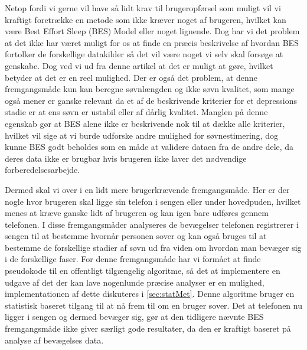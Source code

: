 Netop fordi vi gerne vil have så lidt krav til brugeropførsel som muligt vil vi kraftigt foretrække en metode som ikke kræver noget af brugeren, hvilket kan være Best Effort Sleep (BES) Model eller noget lignende. 
Dog har vi det problem at det ikke har været muligt for os at finde en præcis beskrivelse af hvordan BES fortolker de forskellige datakilder så det vil være noget vi selv skal forsøge at genskabe.
Dog ved vi ud fra denne artikel at det er muligt at gøre, hvilket betyder at det er en reel mulighed.
Der er også det problem, at denne fremgangsmåde kun kan beregne søvnlængden og ikke søvn kvalitet, som mange også mener er ganske relevant da et af de beskrivende kriterier for et depressions stadie er at ens søvn er ustabil eller af dårlig kvalitet.
Manglen på denne egenskab gør at BES alene ikke er beskrivende nok til at dække alle kriterier, hvilket vil sige at vi burde udforske andre mulighed for søvnestimering, dog kunne BES godt beholdes som en måde at validere dataen fra de andre dele, da deres data ikke er brugbar hvis brugeren ikke laver det nødvendige forberedelsesarbejde.

Dermed skal vi over i en lidt mere brugerkrævende fremgangsmåde.
Her er der nogle hvor brugeren skal ligge sin telefon i sengen eller under hovedpuden, hvilket menes at kræve ganske lidt af brugeren og kan igen bare udføres gennem telefonen.
I disse fremgangsmåder analyseres de bevægelser telefonen registrerer i sengen til at bestemme hvornår personen sover og kan også bruges til at bestemme de forskellige stadier af søvn ud fra viden om hvordan man bevæger sig i de forskellige faser.
For denne fremgangsmåde har vi formået at finde pseudokode til en offentligt tilgængelig algoritme, så det at implementere en udgave af det der kan lave nogenlunde præcise analyser er en mulighed, implementationen af dette diskuteres i \cref{sec:statMet}.
Denne algoritme bruger en statistisk baseret tilgang til at nå frem til om en bruger sover.
Det at telefonen nu ligger i sengen og dermed bevæger sig, gør at den tidligere nævnte BES fremgangsmåde ikke giver særligt gode resultater, da den er kraftigt baseret på analyse af bevægelses data.

